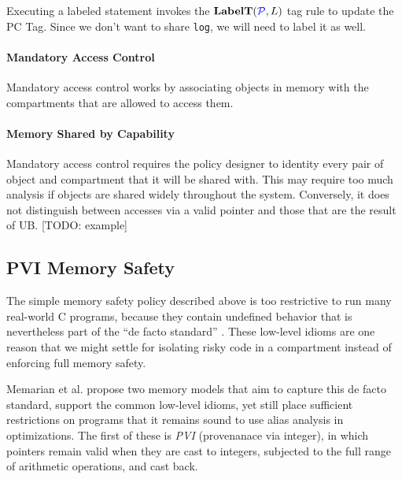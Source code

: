 \documentclass[acmsmall,review,anonymous]{acmart}\settopmatter{printfolios=true,printccs=false,printacmref=false}
\begin{document}
Executing a labeled statement invokes the \(\mathbf{LabelT}(\mathcal{\color{blue} P}, L)\) tag rule to update the PC Tag.
Since we don't want to share {\tt log}, we will need to label it as well.

\paragraph{Mandatory Access Control}

Mandatory access control works by associating objects in memory with the compartments that
are allowed to access them. 

\paragraph{Memory Shared by Capability}

Mandatory access control requires the policy designer to identity every pair of object
and compartment that it will be shared with. This may require too much analysis if
objects are shared widely throughout the system. Conversely, it does not
distinguish between accesses via a valid pointer and those that are the result of
UB. [TODO: example]



%
\subsection{PVI Memory Safety}
\label{sec:PVI}

The simple memory safety policy described above is too restrictive to run many real-world
C programs, because they contain undefined behavior that is nevertheless part of the
``de facto standard'' \cite{???}. These low-level idioms are one reason that we might
settle for isolating risky code in a compartment instead of enforcing full memory safety.

Memarian et al. \cite{???} propose two memory models that aim to capture this
de facto standard, support the common low-level idioms, yet still place sufficient
restrictions on programs that it remains sound to use alias analysis in optimizations.
The first of these is {\it PVI} (provenanace via integer), in which pointers remain valid
when they are cast to integers, subjected to the full range of arithmetic operations, and
cast back.
\end{document}

